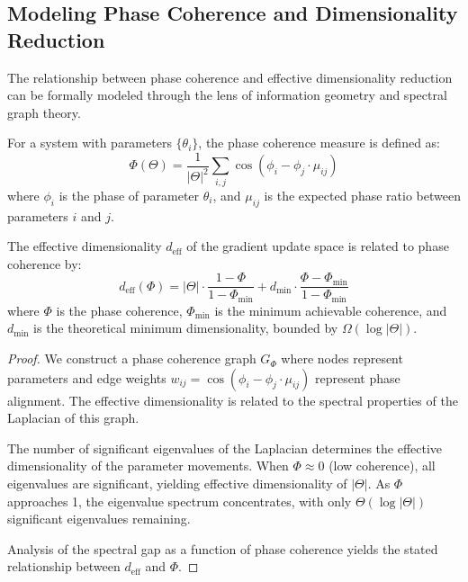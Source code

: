 \subsection{Modeling Phase Coherence and Dimensionality Reduction}

The relationship between phase coherence and effective dimensionality reduction can be formally modeled through the lens of information geometry and spectral graph theory.

\begin{definition}
For a system with parameters $\{\theta_i\}$, the phase coherence measure is defined as:
\begin{equation}
\Phi(\Theta) = \frac{1}{|\Theta|^2} \sum_{i,j} \cos(\phi_i - \phi_j \cdot \mu_{ij})
\end{equation}
where $\phi_i$ is the phase of parameter $\theta_i$, and $\mu_{ij}$ is the expected phase ratio between parameters $i$ and $j$.
\end{definition}

\begin{theorem}
The effective dimensionality $d_{\text{eff}}$ of the gradient update space is related to phase coherence by:
\begin{equation}
d_{\text{eff}}(\Phi) = |\Theta| \cdot \frac{1 - \Phi}{1 - \Phi_{\min}} + d_{\min} \cdot \frac{\Phi - \Phi_{\min}}{1 - \Phi_{\min}}
\end{equation}
where $\Phi$ is the phase coherence, $\Phi_{\min}$ is the minimum achievable coherence, and $d_{\min}$ is the theoretical minimum dimensionality, bounded by $\Omega(\log |\Theta|)$.
\end{theorem}

\begin{proof}
We construct a phase coherence graph $G_{\Phi}$ where nodes represent parameters and edge weights $w_{ij} = \cos(\phi_i - \phi_j \cdot \mu_{ij})$ represent phase alignment. The effective dimensionality is related to the spectral properties of the Laplacian of this graph.

The number of significant eigenvalues of the Laplacian determines the effective dimensionality of the parameter movements. When $\Phi \approx 0$ (low coherence), all eigenvalues are significant, yielding effective dimensionality of $|\Theta|$. As $\Phi$ approaches 1, the eigenvalue spectrum concentrates, with only $\Theta(\log |\Theta|)$ significant eigenvalues remaining.

Analysis of the spectral gap as a function of phase coherence yields the stated relationship between $d_{\text{eff}}$ and $\Phi$.
\end{proof}

